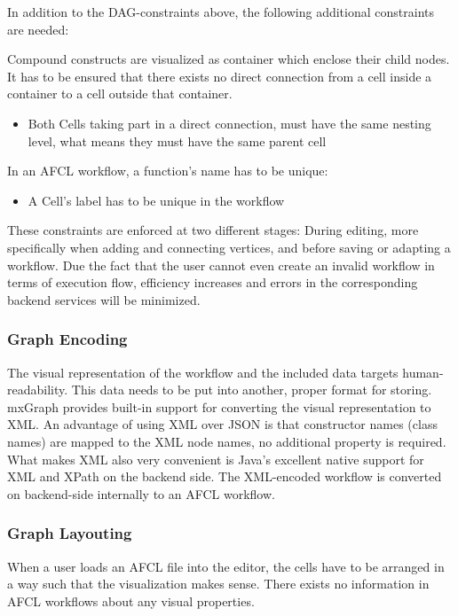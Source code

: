\documentclass[a4paper,top=25mm,bottom=25mm,12pt,pdftex,halfparskip,twoside,bibtotoc,numbers=noenddot]{scrbook}
\begin{document}
In addition to the DAG-constraints above, the following additional constraints are needed:

Compound constructs are visualized as container which enclose their child nodes. It has to be ensured that there exists no direct connection from a cell inside a container to a cell outside that container.
\begin{itemize}
	\item Both \textsf{Cell}s taking part in a direct connection, must have the same nesting level, what means they must have the same parent cell
\end{itemize}
In an AFCL workflow, a function's name has to be unique:
\begin{itemize}
	\item A \textsf{Cell}'s label has to be unique in the workflow
\end{itemize}

These constraints are enforced at two different stages: During editing, more specifically when adding and connecting vertices, and before saving or adapting a workflow.
Due the fact that the user cannot even create an invalid workflow in terms of execution flow, efficiency increases and errors in the corresponding backend services will be minimized.


\subsubsection{Graph Encoding}

The visual representation of the workflow and the included data targets human-readability. This data needs to be put into another, proper format for storing. mxGraph provides built-in support for converting the visual representation to XML. An advantage of using XML over JSON is that constructor names (class names) are mapped to the XML node names, no additional property is required.
What makes XML also very convenient is Java's excellent native support for XML and XPath on the backend side. The XML-encoded workflow is converted on backend-side internally to an AFCL workflow.


\subsubsection{Graph Layouting}

When a user loads an AFCL file into the editor, the cells have to be arranged in a way such that the visualization makes sense. There exists no information in AFCL workflows about any visual properties. 
\end{document}
